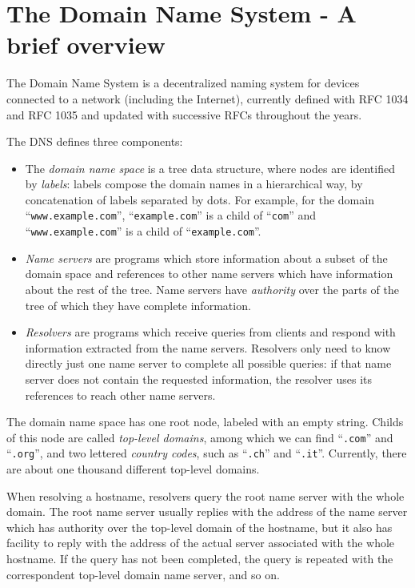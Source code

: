 \documentclass[mscthesis]{usiinfthesis}
\begin{document}
\appendix 

\chapter{The Domain Name System - A brief overview}\label{appx:dns}
The Domain Name System is a decentralized naming system for devices connected to a network (including the Internet), currently defined with RFC 1034\cite{rfc:1034} and RFC 1035\cite{rfc:1035} and updated with successive RFCs throughout the years.

The DNS defines three components:
\begin{itemize}
	\item The \emph{domain name space} is a tree data structure, where nodes are identified by \emph{labels}: labels compose the domain names in a hierarchical way, by concatenation of labels separated by dots. For example, for the domain ``\texttt{www.example.com}'', ``\texttt{example.com}'' is a child of ``\texttt{com}'' and ``\texttt{www.example.com}'' is a child of ``\texttt{example.com}''.
	\item \emph{Name servers} are programs which store information about a subset of the domain space and references to other name servers which have information about the rest of the tree. Name servers have \emph{authority} over the parts of the tree of which they have complete information.
	\item \emph{Resolvers} are programs which receive queries from clients and respond with information extracted from the name servers. Resolvers only need to know directly just one name server to complete all possible queries: if that name server does not contain the requested information, the resolver uses its references to reach other name servers.
\end{itemize}
The domain name space has one root node, labeled with an empty string. Childs of this node are called \emph{top-level domains}, among which we can find ``\texttt{.com}'' and ``\texttt{.org}'', and two lettered \emph{country codes}, such as ``\texttt{.ch}'' and ``\texttt{.it}''. Currently, there are about one thousand different top-level domains\cite{website:tldlist}.

When resolving a hostname, resolvers query the root name server with the whole domain. The root name server usually replies with the address of the name server which has authority over the top-level domain of the hostname, but it also has facility to reply with the address of the actual server associated with the whole hostname. If the query has not been completed, the query is repeated with the correspondent top-level domain name server, and so on.
\end{document}
